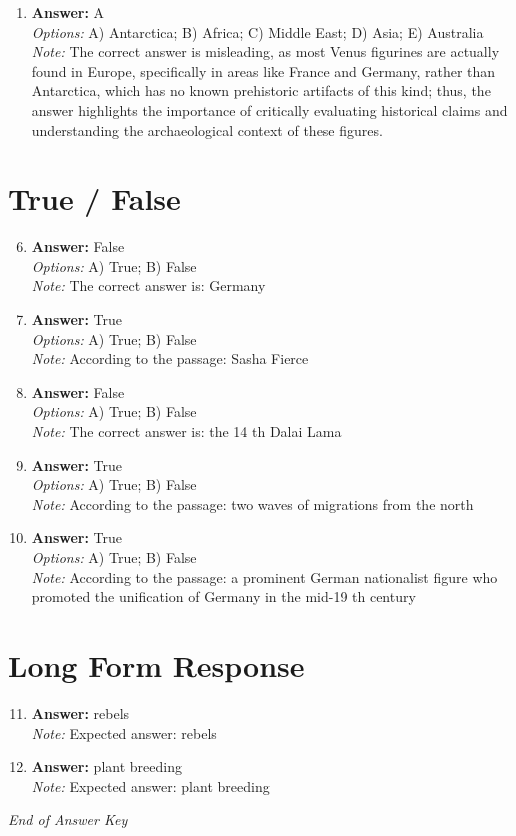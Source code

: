 \documentclass[12pt]{article}
\begin{document}
\begin{enumerate}[label=\arabic*.]
\item \textbf{Answer:} A
\\ \textit{Options:} A) Antarctica; B) Africa; C) Middle East; D) Asia; E) Australia
\\ \textit{Note:} The correct answer is misleading, as most Venus figurines are actually found in Europe, specifically in areas like France and Germany, rather than Antarctica, which has no known prehistoric artifacts of this kind; thus, the answer highlights the importance of critically evaluating historical claims and understanding the archaeological context of these figures.
\end{enumerate}

\section*{True / False}
\begin{enumerate}[label=\arabic*.]
\setcounter{enumi}{5}
\item \textbf{Answer:} False
\\ \textit{Options:} A) True; B) False
\\ \textit{Note:} The correct answer is: Germany
\item \textbf{Answer:} True
\\ \textit{Options:} A) True; B) False
\\ \textit{Note:} According to the passage: Sasha Fierce
\item \textbf{Answer:} False
\\ \textit{Options:} A) True; B) False
\\ \textit{Note:} The correct answer is: the 14 th Dalai Lama
\item \textbf{Answer:} True
\\ \textit{Options:} A) True; B) False
\\ \textit{Note:} According to the passage: two waves of migrations from the north
\item \textbf{Answer:} True
\\ \textit{Options:} A) True; B) False
\\ \textit{Note:} According to the passage: a prominent German nationalist figure who promoted the unification of Germany in the mid-19 th century
\end{enumerate}

\section*{Long Form Response}
\begin{enumerate}[label=\arabic*.]
\setcounter{enumi}{10}
\item \textbf{Answer:} rebels
\\ \textit{Note:} Expected answer: rebels
\item \textbf{Answer:} plant breeding
\\ \textit{Note:} Expected answer: plant breeding
\end{enumerate}

\vfill
\noindent\textit{End of Answer Key}
\end{document}
